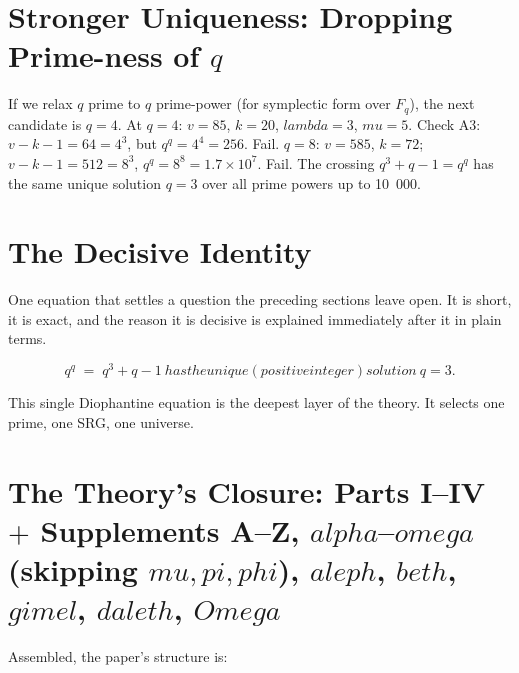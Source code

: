 \documentclass[12pt,a4paper]{article}
\def\mathbb#1{#1}%
\def\textbf#1{#1}%
\def\text#1{#1}%
\def\omega{omega}%
\def\alpha{alpha}%
\def\lambda{lambda}%
\def\mu{mu}%
\def\phi{phi}%
\def\pi{pi}%
\def\aleph{aleph}%
\def\beth{beth}%
\def\gimel{gimel}%
\def\daleth{daleth}%
\def\Omega{Omega}%
\theoremstyle{definition}
\newcommand{\FF}{\mathbb{F}}
\begin{document}
\section*{Stronger Uniqueness: Dropping Prime-ness of $q$}

If we relax $q$ prime to $q$ prime-power (for symplectic form over
$\FF_q$), the next candidate is $q=4$. At $q=4$: $v=85$, $k=20$,
$\lambda=3$, $\mu=5$. Check A3: $v-k-1 = 64 = 4^3$, but $q^q = 4^4 = 256$.
Fail. $q=8$: $v=585$, $k=72$; $v-k-1 = 512 = 8^3$, $q^q = 8^8 = 1.7{\times}10^{7}$.
Fail. The crossing $q^3 + q - 1 = q^q$ has the same unique solution
$q=3$ over all prime powers up to 10~000.

\section*{The Decisive Identity}

\begin{plainbox}
One equation that settles a question the preceding sections leave open. It is short,
it is exact, and the reason it is decisive is explained immediately after it in plain
terms.
\end{plainbox}


\[
\boxed{\;q^q \;=\; q^3 + q - 1\ \text{has the unique (positive integer) solution}\ q = 3.\;}
\]

This single Diophantine equation is the deepest layer of the theory.
It selects \textbf{one} prime, \textbf{one} SRG, \textbf{one} universe.

\section*{The Theory's Closure: Parts I--IV $+$ Supplements A--Z, $\alpha$--$\omega$ (skipping $\mu, \pi, \phi$), $\aleph$, $\beth$, $\gimel$, $\daleth$, $\Omega$}

Assembled, the paper's structure is:
\end{document}
